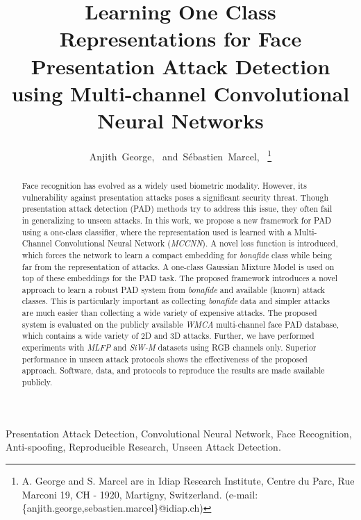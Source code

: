 \documentclass[journal]{IEEEtran}
\begin{document}
\title{Learning One Class Representations for Face Presentation Attack Detection using Multi-channel Convolutional Neural Networks}



\author{Anjith~George, ~and~S\'ebastien~Marcel,~
\thanks{A. George and S. Marcel are in Idiap Research Institute, Centre du Parc, Rue Marconi 19, CH - 1920, Martigny, Switzerland.
(e-mail: \{anjith.george,sebastien.marcel\}@idiap.ch)}}








\maketitle

\begin{abstract}
Face recognition has evolved as a widely used biometric modality. However, its vulnerability against presentation attacks poses a significant security threat. Though presentation attack detection (PAD) methods try to address this issue, they often fail in generalizing to unseen attacks. In this work, we propose a new framework for PAD using a one-class classifier, where the representation used is learned with a Multi-Channel Convolutional Neural Network (\textit{MCCNN}). A novel loss function is introduced, which forces the network to learn a compact embedding for \textit{bonafide} class while being far from the representation of attacks. A one-class Gaussian Mixture Model is used on top of these embeddings for the PAD task.  The proposed framework introduces a novel approach to learn a robust PAD system from \textit{bonafide} and available (known) attack classes. This is particularly important as collecting \textit{bonafide} data and simpler attacks are much easier than collecting a wide variety of expensive attacks. The proposed system is evaluated on the publicly available \textit{WMCA} multi-channel face PAD database, which contains a wide variety of 2D and 3D attacks. Further, we have performed experiments with \textit{MLFP} and \textit{SiW-M} datasets using RGB channels only. Superior performance in unseen attack protocols shows the effectiveness of the proposed approach. Software, data, and protocols to reproduce the results are made available publicly.

\end{abstract}

\begin{IEEEkeywords}
Presentation Attack Detection, Convolutional Neural Network, Face Recognition, Anti-spoofing, Reproducible Research, Unseen Attack Detection.
\end{IEEEkeywords}
\end{document}
